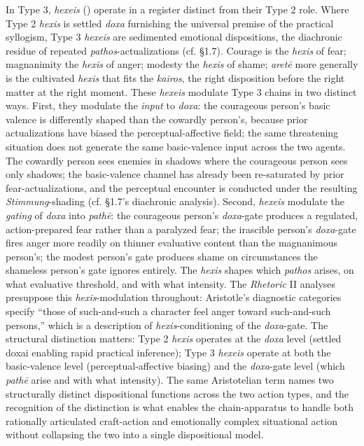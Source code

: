 In Type 3, \textit{hexeis} () operate in a register distinct from their Type 2 role. Where Type 2 \textit{hexis} is settled \textit{doxa} furnishing the universal premise of the practical syllogism, Type 3 \textit{hexeis} are sedimented emotional dispositions, the diachronic residue of repeated \textit{pathos}-actualizations (cf. \S 1.7). Courage is the \textit{hexis} of fear; magnanimity the \textit{hexis} of anger; modesty the \textit{hexis} of shame; \textit{aretē} more generally is the cultivated \textit{hexis} that fits the \textit{kairos}, the right disposition before the right matter at the right moment. These \textit{hexeis} modulate Type 3 chains in two distinct ways. First, they modulate the \textit{input} to \textit{doxa}: the courageous person's basic valence is differently shaped than the cowardly person's, because prior actualizations have biased the perceptual-affective field; the same threatening situation does not generate the same basic-valence input across the two agents. The cowardly person sees enemies in shadows where the courageous person sees only shadows; the basic-valence channel has already been re-saturated by prior fear-actualizations, and the perceptual encounter is conducted under the resulting \textit{Stimmung}-shading (cf. \S 1.7's diachronic analysis). Second, \textit{hexeis} modulate the \textit{gating} of \textit{doxa} into \textit{pathē}: the courageous person's \textit{doxa}-gate produces a regulated, action-prepared fear rather than a paralyzed fear; the irascible person's \textit{doxa}-gate fires anger more readily on thinner evaluative content than the magnanimous person's; the modest person's gate produces shame on circumstances the shameless person's gate ignores entirely. The \textit{hexis} shapes which \textit{pathos} arises, on what evaluative threshold, and with what intensity. The \textit{Rhetoric} II analyses presuppose this \textit{hexis}-modulation throughout: Aristotle's diagnostic categories specify ``those of such-and-such a character feel anger toward such-and-such persons,'' which is a description of \textit{hexis}-conditioning of the \textit{doxa}-gate. The structural distinction matters: Type 2 \textit{hexis} operates at the \textit{doxa} level (settled doxai enabling rapid practical inference); Type 3 \textit{hexeis} operate at both the basic-valence level (perceptual-affective biasing) and the \textit{doxa}-gate level (which \textit{pathē} arise and with what intensity). The same Aristotelian term names two structurally distinct dispositional functions across the two action types, and the recognition of the distinction is what enables the chain-apparatus to handle both rationally articulated craft-action and emotionally complex situational action without collapsing the two into a single dispositional model.

